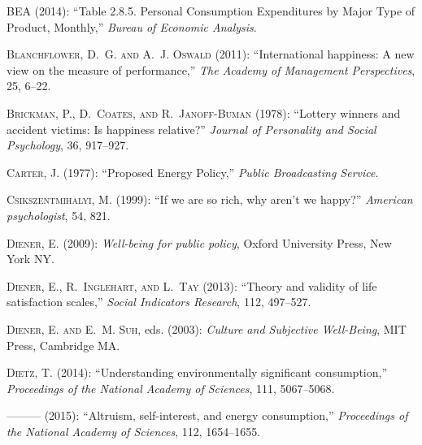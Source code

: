 \documentclass[10pt, letterpaper]{article}
\begin{document}
\begin{spacing}{1.5}
\begin{thebibliography}{52}
\textsc{BEA} (2014): \enquote{Table 2.8.5. Personal Consumption Expenditures by
  Major Type of Product, Monthly,} \emph{Bureau of Economic Analysis}.

\textsc{Blanchflower, D.~G. and A.~J. Oswald} (2011): \enquote{International
  happiness: A new view on the measure of performance,} \emph{The Academy of
  Management Perspectives}, 25, 6--22.

\textsc{Brickman, P., D.~Coates, and R.~Janoff-Buman} (1978): \enquote{Lottery
  winners and accident victims: Is happiness relative?} \emph{Journal of
  Personality and Social Psychology}, 36, 917--927.

\textsc{Carter, J.} (1977): \enquote{Proposed Energy Policy,} \emph{Public
  Broadcasting Service}.

\textsc{Csikszentmihalyi, M.} (1999): \enquote{If we are so rich, why aren't we
  happy?} \emph{American psychologist}, 54, 821.

\textsc{Diener, E.} (2009): \emph{Well-being for public policy}, Oxford
  University Press, New York NY.

\textsc{Diener, E., R.~Inglehart, and L.~Tay} (2013): \enquote{Theory and
  validity of life satisfaction scales,} \emph{Social Indicators Research},
  112, 497--527.

\textsc{Diener, E. and E.~M. Suh}, eds. (2003): \emph{Culture and Subjective
  Well-Being}, MIT Press, Cambridge MA.

\textsc{Dietz, T.} (2014): \enquote{Understanding environmentally significant
  consumption,} \emph{Proceedings of the National Academy of Sciences}, 111,
  5067--5068.

---\hspace{-.1pt}---\hspace{-.1pt}--- (2015): \enquote{Altruism, self-interest,
  and energy consumption,} \emph{Proceedings of the National Academy of
  Sciences}, 112, 1654--1655.


\end{thebibliography}
\end{spacing}
\end{document}
